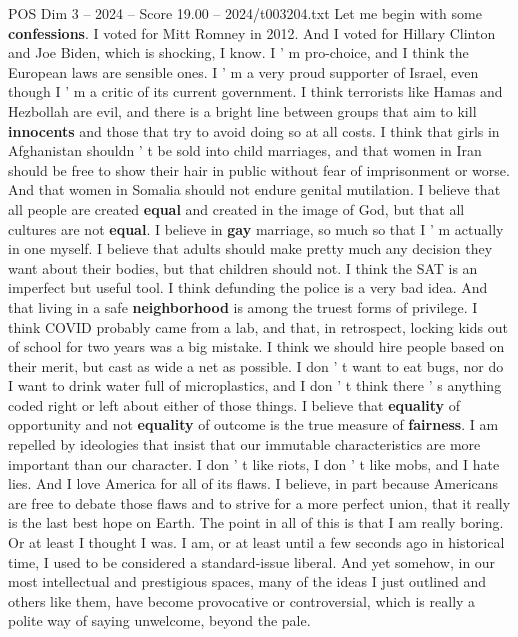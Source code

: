 \begin{textsample}{POS Dim 3 – 2024 – Score 19.00 – 2024/t003204.txt}  \label{ex:f3_pos_023}
Let me begin with some \textbf{confessions}.
I voted for Mitt Romney in 2012.
And I voted for Hillary Clinton and Joe Biden, which is shocking, I know.
I ' m pro-choice, and I think the European laws are sensible ones.
I ' m a very proud supporter of Israel, even though I ' m a critic of its current government.
I think terrorists like Hamas and Hezbollah are evil, and there is a bright line between groups that aim to kill \textbf{innocents} and those that try to avoid doing so at all costs.
I think that girls in Afghanistan shouldn ' t be sold into child marriages, and that women in Iran should be free to show their hair in public without fear of imprisonment or worse.
And that women in Somalia should not endure genital mutilation.
I believe that all people are created \textbf{equal} and created in the image of God, but that all cultures are not \textbf{equal}.
I believe in \textbf{gay} marriage, so much so that I ' m actually in one myself.
I believe that adults should make pretty much any decision they want about their bodies, but that children should not.
I think the SAT is an imperfect but useful tool.
I think defunding the police is a very bad idea.
And that living in a safe \textbf{neighborhood} is among the truest forms of privilege.
I think COVID probably came from a lab, and that, in retrospect, locking kids out of school for two years was a big mistake.
I think we should hire people based on their merit, but cast as wide a net as possible.
I don ' t want to eat bugs, nor do I want to drink water full of microplastics, and I don ' t think there ' s anything coded right or left about either of those things.
I believe that \textbf{equality} of opportunity and not \textbf{equality} of outcome is the true measure of \textbf{fairness}.
I am repelled by ideologies that insist that our immutable characteristics are more important than our character.
I don ' t like riots, I don ' t like mobs, and I hate lies.
And I love America for all of its flaws.
I believe, in part because Americans are free to debate those flaws and to strive for a more perfect union, that it really is the last best hope on Earth.
The point in all of this is that I am really boring.
Or at least I thought I was.
I am, or at least until a few seconds ago in historical time, I used to be considered a standard-issue liberal.
And yet somehow, in our most intellectual and prestigious spaces, many of the ideas I just outlined and others like them, have become provocative or controversial, which is really a polite way of saying unwelcome, beyond the pale.

\end{textsample}
